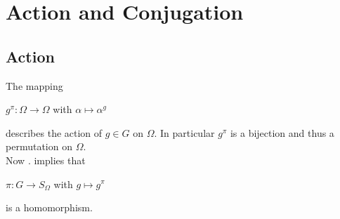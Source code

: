 %
%

\section{Action and Conjugation}

\subsection{Action}


The mapping\\
\centerline{
$g^\pi:\Omega\to\Omega$ with $\alpha\mapsto\alpha^g$}
describes the action of $g\in G$ on $\Omega$. In particular $g^\pi$ is a bijection and thus a permutation on $\Omega$. \\

Now . implies that\\
\centerline{
$\pi:G\to S_\Omega$ with $g\mapsto g^\pi$}
is a homomorphism.


%